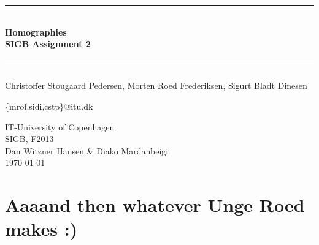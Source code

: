 \documentclass[]{article}
\begin{document}
\begin{titlepage}
\centering \parindent=0pt
\newcommand{\HRule}{\rule{\textwidth}{1mm}}
 \HRule\\[1cm]\Huge\bfseries
Homographies\\[0.7cm]
\large SIGB Assignment 2\\[1cm]
\HRule\\[4cm]  
Christoffer Stougaard Pedersen, Morten Roed Frederiksen, Sigurt
Bladt Dinesen


\small \{mrof,sidi,cstp\}@itu.dk
 \normalsize %
\begin{flushleft}
IT-University of Copenhagen \\
SIGB, F2013\\
Dan Witzner Hansen \& Diako Mardanbeigi \\
\today \end{flushleft}
\end{titlepage}

\tableofcontents
\pagebreak










\section{Aaaand then whatever Unge Roed makes :)}
\end{document}
